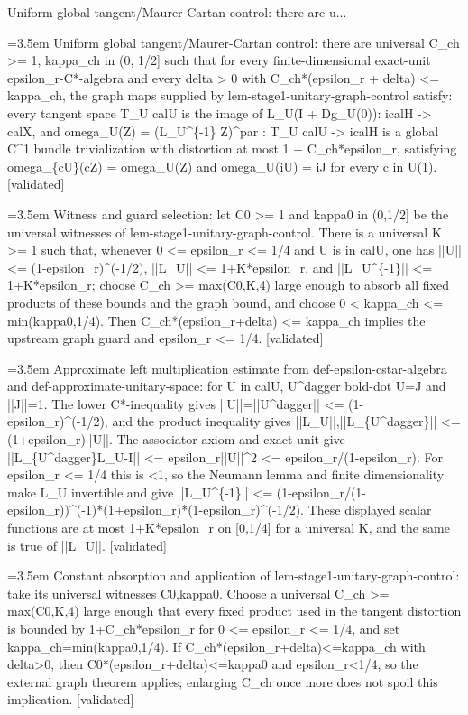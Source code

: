 \documentclass{article}
\newcommand{\step}[1]{\par\noindent\hangindent=3.5em\hangafter=1%
  \makebox[3.5em][l]{\textbf{#1.}}}
\newcommand{\steptag}[1]{\hfill{\small\textsf{[#1]}}}
\begin{document}
\begin{proofbox}{Uniform global tangent/Maurer-Cartan control: there are u...}
\step{1} Uniform global tangent/Maurer-Cartan control: there are universal C\_ch >= 1, kappa\_ch in (0, 1/2] such that for every finite-dimensional exact-unit epsilon\_r-C*-algebra and every delta > 0 with C\_ch*(epsilon\_r + delta) <= kappa\_ch, the graph maps supplied by lem-stage1-unitary-graph-control satisfy: every tangent space T\_U calU is the image of L\_U(I + Dg\_U(0)): icalH -> calX, and omega\_U(Z) = (L\_U\textasciicircum{}\{-1\} Z)\textasciicircum{}par : T\_U calU -> icalH is a global C\textasciicircum{}1 bundle trivialization with distortion at most 1 + C\_ch*epsilon\_r, satisfying omega\_\{cU\}(cZ) = omega\_U(Z) and omega\_U(iU) = iJ for every c in U(1). \steptag{validated} \\[6pt]
\step{1.1} Witness and guard selection: let C0 >= 1 and kappa0 in (0,1/2] be the universal witnesses of lem-stage1-unitary-graph-control. There is a universal K >= 1 such that, whenever 0 <= epsilon\_r <= 1/4 and U is in calU, one has ||U|| <= (1-epsilon\_r)\textasciicircum{}(-1/2), ||L\_U|| <= 1+K*epsilon\_r, and ||L\_U\textasciicircum{}\{-1\}|| <= 1+K*epsilon\_r; choose C\_ch >= max(C0,K,4) large enough to absorb all fixed products of these bounds and the graph bound, and choose 0 < kappa\_ch <= min(kappa0,1/4). Then C\_ch*(epsilon\_r+delta) <= kappa\_ch implies the upstream graph guard and epsilon\_r <= 1/4. \steptag{validated} \\[6pt]
\step{1.1.1} Approximate left multiplication estimate from def-epsilon-cstar-algebra and def-approximate-unitary-space: for U in calU, U\textasciicircum{}dagger bold-dot U=J and ||J||=1. The lower C*-inequality gives ||U||=||U\textasciicircum{}dagger|| <= (1-epsilon\_r)\textasciicircum{}(-1/2), and the product inequality gives ||L\_U||,||L\_\{U\textasciicircum{}dagger\}|| <= (1+epsilon\_r)||U||. The associator axiom and exact unit give ||L\_\{U\textasciicircum{}dagger\}L\_U-I|| <= epsilon\_r||U||\textasciicircum{}2 <= epsilon\_r/(1-epsilon\_r). For epsilon\_r <= 1/4 this is <1, so the Neumann lemma and finite dimensionality make L\_U invertible and give ||L\_U\textasciicircum{}\{-1\}|| <= (1-epsilon\_r/(1-epsilon\_r))\textasciicircum{}(-1)*(1+epsilon\_r)*(1-epsilon\_r)\textasciicircum{}(-1/2). These displayed scalar functions are at most 1+K*epsilon\_r on [0,1/4] for a universal K, and the same is true of ||L\_U||. \steptag{validated} \\[4pt]
\step{1.1.2} Constant absorption and application of lem-stage1-unitary-graph-control: take its universal witnesses C0,kappa0. Choose a universal C\_ch >= max(C0,K,4) large enough that every fixed product used in the tangent distortion is bounded by 1+C\_ch*epsilon\_r for 0 <= epsilon\_r <= 1/4, and set kappa\_ch=min(kappa0,1/4). If C\_ch*(epsilon\_r+delta)<=kappa\_ch with delta>0, then C0*(epsilon\_r+delta)<=kappa0 and epsilon\_r<1/4, so the external graph theorem applies; enlarging C\_ch once more does not spoil this implication. \steptag{validated} \\[4pt]

\end{proofbox}
\end{document}
